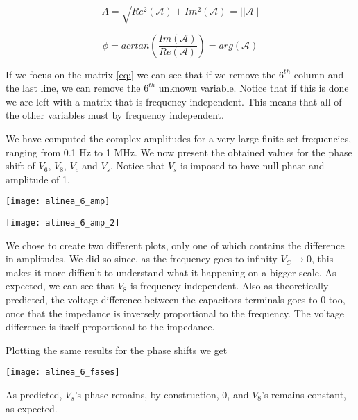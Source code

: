 \begin{center}
    \begin{equation}
        A=\sqrt{Re^2(\mathcal{A})+Im^2(\mathcal{A})}=||\mathcal{A}||
    \end{equation}
\end{center}

\begin{center}
    \begin{equation}
        \phi=acrtan\left(\frac{Im(\mathcal{A})}{Re(\mathcal{A})}\right)=arg(\mathcal{A})
    \end{equation}
\end{center}

If we focus on the matrix \ref{eq:} we can see that if we remove the $6^{th}$ column and the last line, we can remove the $6^{th}$ unknown variable. Notice that if this is done we are left with a matrix that is frequency independent. This means that all of the other variables must by frequency independent.

We have computed the complex amplitudes for a very large finite set frequencies, ranging from 0.1 Hz to 1 MHz. We now present the obtained values for the phase shift of $V_6$, $V_8$, $V_c$ and $V_s$. Notice that $V_s$ is imposed to have null phase and amplitude of 1.

\begin{center}
    \texttt{[image: alinea\_6\_amp]}
     \label{fig:amp(f)1}
\end{center}

\begin{center}
    \texttt{[image: alinea\_6\_amp\_2]}
     \label{fig:amp(f)2}
\end{center}

We chose to create two different plots, only one of which contains the difference in amplitudes. We did so since, as the frequency goes to infinity $V_C\longrightarrow0$, this makes it more difficult to understand what it happening on a bigger scale.
As expected, we can see that $V_8$ is frequency independent. Also as theoretically predicted, the voltage difference between the capacitors terminals goes to 0 too, once that the impedance is inversely proportional to the frequency. The voltage difference is itself proportional to the impedance.

Plotting the same results for the phase shifts we get
\begin{center}
    \texttt{[image: alinea\_6\_fases]}
     \label{fig:amp(f)1}
\end{center}

As predicted, $V_s$'s phase remains, by construction, 0, and $V_8$'s remains constant, as expected.
